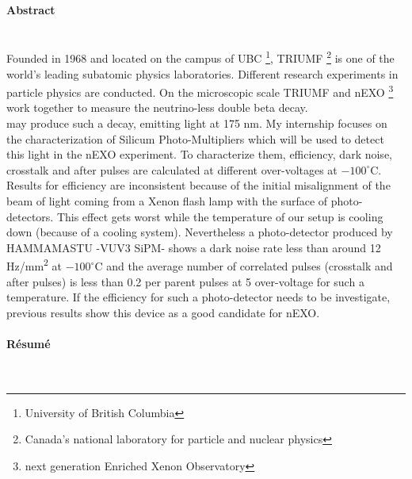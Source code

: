 \documentclass[a4paper, 11pt]{report}%
\newcommand{\xfl}{Xenon flash lamp }
\newcommand{\TR}{TRIUMF }
\begin{document}
\newpage
\thispagestyle{empty}

\paragraph{Abstract}\hspace{0.5cm}\\
  
  Founded in 1968 and located on the campus of UBC \footnote{University of British Columbia}, \TR \footnote{Canada's 
  national laboratory 
  for particle and nuclear physics} is one of the world's leading subatomic physics laboratories. Different research experiments in particle physics
  are conducted. On the microscopic scale \TR and nEXO \footnote{next generation Enriched Xenon Observatory} work together to measure 
  the neutrino-less double beta decay.\\
   may produce such a decay, emitting light at 175 nm. My internship focuses on the characterization of Silicum Photo-Multipliers which will be 
  used to detect this light in the nEXO experiment. To characterize them, efficiency, dark noise, crosstalk and after pulses are calculated
  at different over-voltages at $-100^\circ$C.\\
  Results for efficiency are inconsistent because of the initial misalignment of the beam of light coming from a \xfl with the surface of  
  photo-detectors. This effect gets 
  worst while the temperature of our setup is cooling down (because of a cooling system). Nevertheless a photo-detector produced 
  by HAMMAMASTU -VUV3 SiPM- shows a dark 
  noise rate less than around 12 Hz/mm\textsuperscript{2} at $-100^\circ$C and the average number of correlated pulses (crosstalk and after pulses)
  is less than 0.2 per parent pulses at 5 over-voltage for such a temperature. If the efficiency for such a photo-detector needs to be investigate, previous 
  results show
  this device as a good candidate for nEXO.  
  
  \paragraph{R\'esum\'e}\hspace{0.5cm}\\
   
\end{document}
